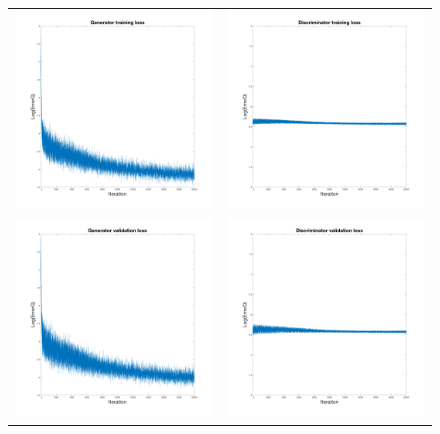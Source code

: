 \documentclass[10pt,twocolumn,letterpaper]{article}
\begin{document}
\begin{figure}[h!]
\setlength\tabcolsep{1.5pt}
\centering
\begin{tabular}{cc}

\includegraphics[width=.50\textwidth]{figures/loss/trainErrorG.png}&
\includegraphics[width=.50\textwidth]{figures/loss/trainErrorD.png} \\
\includegraphics[width=.50\textwidth]{figures/loss/validErrorG.png}&
\includegraphics[width=.50\textwidth]{figures/loss/validErrorD.png} \\

\end{tabular}
\end{figure}
\end{document}
